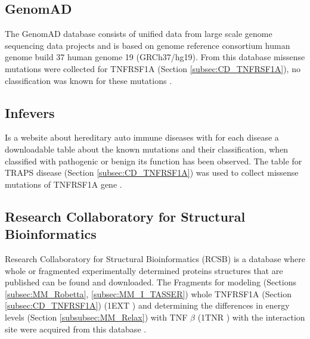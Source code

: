 \subsection{GenomAD}
The GenomAD database consists of unified data from large scale genome sequencing data projects and is based on genome reference consortium human genome build 37 human genome 19 (GRCh37/hg19). From this database missense mutations were collected for TNFRSF1A (Section \ref{subsec:CD_TNFRSF1A}), no classification was known for these mutations \cite{gnomad_gnomad_nodate}.
\label{subsec:MM_GnomAD}

\subsection{Infevers}
Is a website about hereditary auto immune diseases with for each disease a downloadable table about the known mutations and their classification, when classified with pathogenic or benign its function has been observed. The table for TRAPS disease (Section \ref{subsec:CD_TNFRSF1A}) was used to collect missense mutations of TNFRSF1A gene \cite{sarrauste_de_menthiere_infevers:_2003}.
\label{subsec:MM_Infevers}

\subsection{Research Collaboratory for Structural Bioinformatics}
Research Collaboratory for Structural Bioinformatics (RCSB) is a database where whole or fragmented experimentally determined proteins structures that are published can be found and downloaded. The Fragments for modeling (Sections \ref{subsec:MM_Robetta}, \ref{subsec:MM_I_TASSER}) whole TNFRSF1A (Section \ref{subsec:CD_TNFRSF1A}) (1EXT \cite{naismith_structures_1996}) and determining the differences in energy levels (Section \ref{subsubsec:MM_Relax}) with TNF $\beta$ (1TNR \cite{banner_crystal_1993}) with the interaction site were acquired from this database \cite{burley_rcsb_2018}.
\label{subsec:MM_RCSB}

